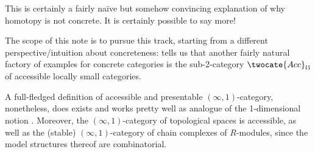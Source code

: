 \documentclass[12pt]{amsart}
\begin{document}
This is certainly a fairly na\"ive but somehow convincing explanation of why homotopy is not concrete. It is certainly possible to say more! 

The scope of this note is to pursue this track, starting from a different perspective/intuition about concreteness: \aprop {} tells us that another fairly natural factory of examples for concrete categories is the sub-2-category $\twocate{Acc}_\mho$ of accessible locally small categories.

A full-fledged definition of accessible and presentable $(\infty,1)$-category, nonetheless, does exists and works pretty well as analogue of the 1-dimensional notion \cite{HTT,Joy}. Moreover, the $(\infty,1)$-category of topological spaces is accessible, as well as the (stable) $(\infty,1)$-category of chain complexes of $R$-modules, since the model structures thereof are combinatorial.
\end{document}
